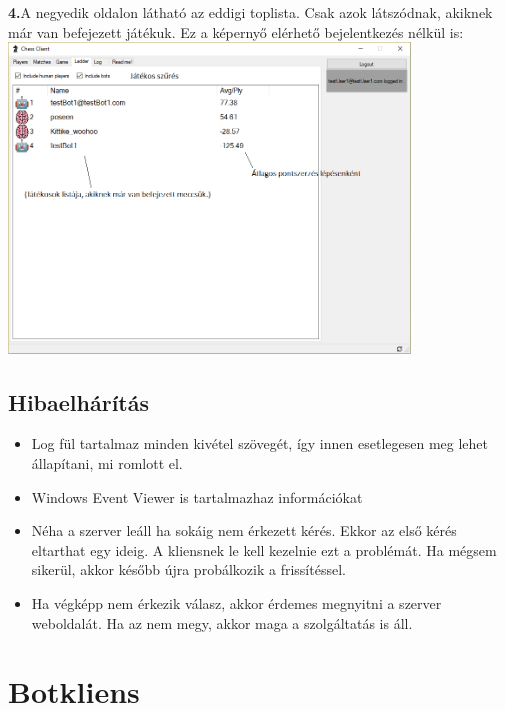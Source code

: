 \documentclass[twoside, a4paper, 12pt]{article}
\begin{document}
\noindent \textbf{4.}A negyedik oldalon látható az eddigi toplista. Csak azok látszódnak, akiknek már van befejezett játékuk. Ez a képernyő elérhető bejelentkezés nélkül is: \\
\includegraphics[width=0.8\textwidth]{img/chessClient_4.png} \\
\subsection{Hibaelhárítás}
\begin{itemize}
	\item Log fül tartalmaz minden kivétel szövegét, így innen esetlegesen meg lehet állapítani, mi romlott el.
	\item Windows Event Viewer is tartalmazhaz információkat
	\item Néha a szerver leáll ha sokáig nem érkezett kérés. Ekkor az első kérés eltarthat egy ideig. A kliensnek le kell kezelnie ezt a problémát. Ha mégsem sikerül, akkor később újra probálkozik a frissítéssel.
	\item Ha végképp nem érkezik válasz, akkor érdemes megnyitni a szerver weboldalát. Ha az nem megy, akkor maga a szolgáltatás is áll.
\end{itemize}
	

\section{Botkliens}
\end{document}
